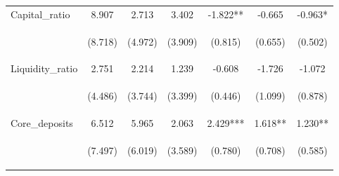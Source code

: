 \documentclass[]{article}
\begin{document}
\begin{center}
\begin{tabular}{lcccccc}
Capital\_ratio & 8.907 & 2.713 & 3.402 & -1.822** & -0.665 & -0.963* \\
\vspace{4pt} & \begin{footnotesize}(8.718)\end{footnotesize} & \begin{footnotesize}(4.972)\end{footnotesize} & \begin{footnotesize}(3.909)\end{footnotesize} & \begin{footnotesize}(0.815)\end{footnotesize} & \begin{footnotesize}(0.655)\end{footnotesize} & \begin{footnotesize}(0.502)\end{footnotesize} \\
Liquidity\_ratio & 2.751 & 2.214 & 1.239 & -0.608 & -1.726 & -1.072 \\
\vspace{4pt} & \begin{footnotesize}(4.486)\end{footnotesize} & \begin{footnotesize}(3.744)\end{footnotesize} & \begin{footnotesize}(3.399)\end{footnotesize} & \begin{footnotesize}(0.446)\end{footnotesize} & \begin{footnotesize}(1.099)\end{footnotesize} & \begin{footnotesize}(0.878)\end{footnotesize} \\
Core\_deposits & 6.512 & 5.965 & 2.063 & 2.429*** & 1.618** & 1.230** \\
\vspace{4pt} & \begin{footnotesize}(7.497)\end{footnotesize} & \begin{footnotesize}(6.019)\end{footnotesize} & \begin{footnotesize}(3.589)\end{footnotesize} & \begin{footnotesize}(0.780)\end{footnotesize} & \begin{footnotesize}(0.708)\end{footnotesize} & \begin{footnotesize}(0.585)\end{footnotesize} \\

\end{tabular}
\end{center}
\end{document}
